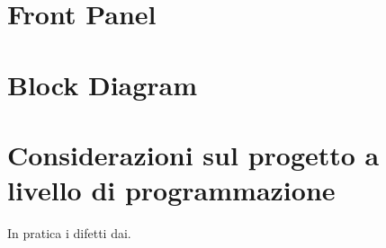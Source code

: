 \section{Front Panel}

\section{Block Diagram}

\section{Considerazioni sul progetto a livello di programmazione}

In pratica i difetti dai.